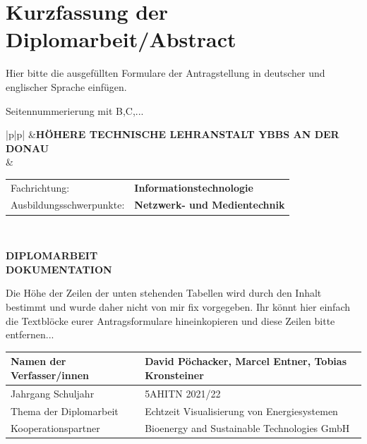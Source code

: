 \chapter*{Kurzfassung der Diplomarbeit/Abstract} 

Hier bitte die ausgefüllten Formulare der Antragstellung in deutscher und englischer Sprache einfügen.

Seitennummerierung mit B,C,...

\clearpage

\newlength{\htllogobreite}
\newlength{\beschriftungsbreite}
\newlength{\feldA}
\newlength{\feldB}

\begin{tabular}{|p{\htllogobreite}|p{\beschriftungsbreite}|}
\hline
{}&{\vspace{0.05em}\textbf{HÖHERE TECHNISCHE LEHRANSTALT YBBS AN DER DONAU}}\\[1.05em]
 & { \begin{tabular}{p{\feldA} p{\feldB}}
    Fachrichtung:&\textbf{Informationstechnologie}\\
    Ausbildungsschwerpunkte:&\textbf{Netzwerk- und Medientechnik}\\
   \end{tabular}
   }\\
\hline
\end{tabular}

\begin{center}
 \LARGE \textbf{DIPLOMARBEIT}\\
 \Large \textbf{DOKUMENTATION}\\
 \normalsize
\end{center}

Die Höhe der Zeilen der unten stehenden Tabellen wird durch den Inhalt bestimmt und wurde daher nicht von mir fix vorgegeben.
Ihr könnt hier einfach die Textblöcke eurer Antragsformulare hineinkopieren und diese Zeilen bitte entfernen...

\newlength{\feldC}
\newlength{\feldD}

\linespread{1.1} \normalsize
\begin{tabular}{|p{\feldC}|p{\feldD}|}
 \hline
 Namen der Verfasser/innen & David Pöchacker, Marcel Entner, Tobias Kronsteiner \\
 \hline
 Jahrgang Schuljahr & 5AHITN  2021/22 \\
 \hline
 Thema der Diplomarbeit &Echtzeit Visualisierung von Energiesystemen \\
 \hline
 Kooperationspartner & Bioenergy and Sustainable Technologies GmbH\\
 \hline
\end{tabular}

